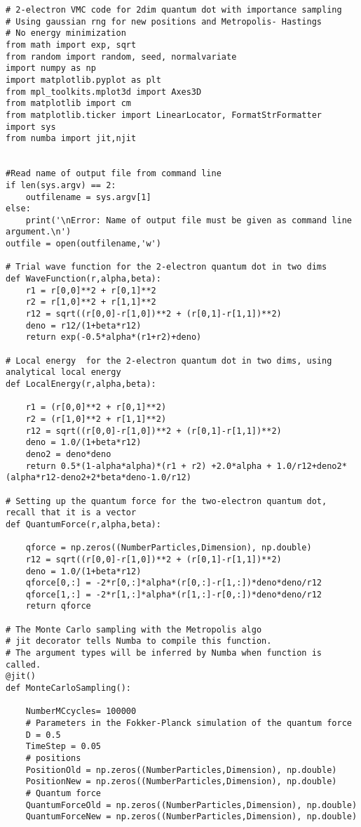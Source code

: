 \begin{verbatim}
# 2-electron VMC code for 2dim quantum dot with importance sampling
# Using gaussian rng for new positions and Metropolis- Hastings 
# No energy minimization
from math import exp, sqrt
from random import random, seed, normalvariate
import numpy as np
import matplotlib.pyplot as plt
from mpl_toolkits.mplot3d import Axes3D
from matplotlib import cm
from matplotlib.ticker import LinearLocator, FormatStrFormatter
import sys
from numba import jit,njit


#Read name of output file from command line
if len(sys.argv) == 2:
    outfilename = sys.argv[1]
else:
    print('\nError: Name of output file must be given as command line argument.\n')
outfile = open(outfilename,'w')

# Trial wave function for the 2-electron quantum dot in two dims
def WaveFunction(r,alpha,beta):
    r1 = r[0,0]**2 + r[0,1]**2
    r2 = r[1,0]**2 + r[1,1]**2
    r12 = sqrt((r[0,0]-r[1,0])**2 + (r[0,1]-r[1,1])**2)
    deno = r12/(1+beta*r12)
    return exp(-0.5*alpha*(r1+r2)+deno)

# Local energy  for the 2-electron quantum dot in two dims, using analytical local energy
def LocalEnergy(r,alpha,beta):
    
    r1 = (r[0,0]**2 + r[0,1]**2)
    r2 = (r[1,0]**2 + r[1,1]**2)
    r12 = sqrt((r[0,0]-r[1,0])**2 + (r[0,1]-r[1,1])**2)
    deno = 1.0/(1+beta*r12)
    deno2 = deno*deno
    return 0.5*(1-alpha*alpha)*(r1 + r2) +2.0*alpha + 1.0/r12+deno2*(alpha*r12-deno2+2*beta*deno-1.0/r12)

# Setting up the quantum force for the two-electron quantum dot, recall that it is a vector
def QuantumForce(r,alpha,beta):

    qforce = np.zeros((NumberParticles,Dimension), np.double)
    r12 = sqrt((r[0,0]-r[1,0])**2 + (r[0,1]-r[1,1])**2)
    deno = 1.0/(1+beta*r12)
    qforce[0,:] = -2*r[0,:]*alpha*(r[0,:]-r[1,:])*deno*deno/r12
    qforce[1,:] = -2*r[1,:]*alpha*(r[1,:]-r[0,:])*deno*deno/r12
    return qforce
    
# The Monte Carlo sampling with the Metropolis algo
# jit decorator tells Numba to compile this function.
# The argument types will be inferred by Numba when function is called.
@jit()
def MonteCarloSampling():

    NumberMCcycles= 100000
    # Parameters in the Fokker-Planck simulation of the quantum force
    D = 0.5
    TimeStep = 0.05
    # positions
    PositionOld = np.zeros((NumberParticles,Dimension), np.double)
    PositionNew = np.zeros((NumberParticles,Dimension), np.double)
    # Quantum force
    QuantumForceOld = np.zeros((NumberParticles,Dimension), np.double)
    QuantumForceNew = np.zeros((NumberParticles,Dimension), np.double)


\end{verbatim}
